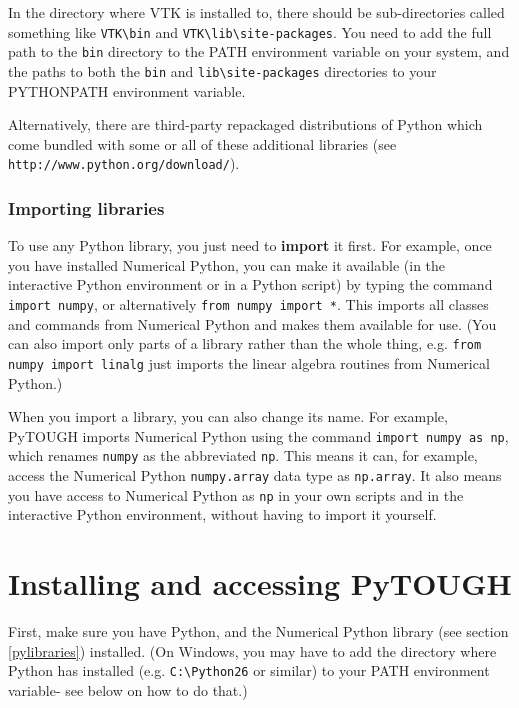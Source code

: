 In the directory where VTK is installed to, there should be sub-directories called something like \texttt{VTK\textbackslash bin} and \texttt{VTK\textbackslash lib\textbackslash site-packages}.  You need to add the full path to the \texttt{bin} directory to the PATH environment variable on your system, and the paths to both the \texttt{bin} and \texttt{lib\textbackslash site-packages} directories to your PYTHONPATH environment variable.

Alternatively, there are third-party repackaged distributions of Python which come bundled with some or all of these additional libraries (see \texttt{http://www.python.org/download/}).

\subsubsection{Importing libraries}

To use any Python library, you just need to \textbf{import} it first.  For example, once you have installed Numerical Python, you can make it available (in the interactive Python environment or in a Python script) by typing the command \texttt{import numpy}, or alternatively \texttt{from numpy import *}.  This imports all classes and commands from Numerical Python and makes them available for use.  (You can also import only parts of a library rather than the whole thing, e.g. \texttt{from numpy import linalg} just imports the linear algebra routines from Numerical Python.)

When you import a library, you can also change its name.  For example, PyTOUGH imports Numerical Python using the command \texttt{import numpy as np}, which renames \texttt{numpy} as the abbreviated \texttt{np}.  This means it can, for example, access the Numerical Python \texttt{numpy.array} data type as \texttt{np.array}.  It also means you have access to Numerical Python as \texttt{np} in your own scripts and in the interactive Python environment, without having to import it yourself.

\section{Installing and accessing PyTOUGH}
\label{installing}

First, make sure you have Python, and the Numerical Python library (see section \ref{pylibraries}) installed.  (On Windows, you may have to add the directory where Python has installed (e.g. \texttt{C:\textbackslash Python26} or similar) to your PATH environment variable- see below on how to do that.)

